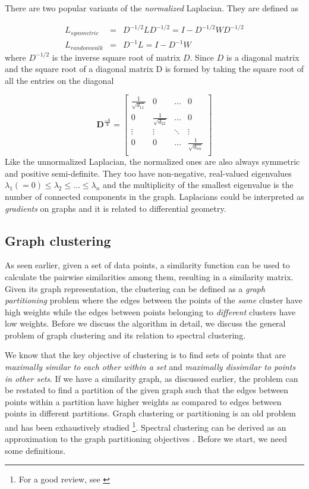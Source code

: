 There are two popular variants of the \textit{normalized} Laplacian. They are defined as

\begin{eqnarray}
	L_{symmetric} &=& D^{-1/2} L D^{-1/2} = I - D^{-1/2} W D^{-1/2} \label{eqn-lap_sym}\\
	L_{random walk} &=& D^{-1}L = I - D^{-1}W 
\end{eqnarray}
where $D^{-1/2}$ is the inverse square root of matrix $D$. Since $D$ is a diagonal matrix and the square root of a diagonal matrix D is formed by taking the square root of all the entries on the diagonal

\begin{displaymath}
    \mathbf{D^{\frac{-1}{2}}} = \begin{bmatrix} \frac{1}{\sqrt{d_{11}}} & 0 & \dots & 0\\
				 0 & \frac{1}{\sqrt{d_{22}}} & \dots & 0\\
                                 \vdots & \vdots & \ddots & \vdots\\
				 0 & 0 & \dots & \frac{1}{\sqrt{d_{nn}}}\\
                 \end{bmatrix}
\end{displaymath}
Like the unnormalized Laplacian, the normalized ones are also always symmetric and positive semi-definite. They too have non-negative, real-valued 
eigenvalues $\lambda_{1}(=0) \leq \lambda_{2}\leq \dots \leq \lambda_{n}$ and the multiplicity of the smallest eigenvalue is the number of 
connected components in the graph. Laplacians could be interpreted as \textit{gradients} on graphs and it is related to differential geometry. 
\subsection{Graph clustering}
As seen earlier, given a set of data points, a similarity function can be used to calculate the pairwise similarities among them, resulting in a similarity matrix. Given its graph representation, the clustering can be defined as a \textit{graph partitioning} problem where the edges between the points of the \textit{same} cluster have high weights while the edges between points belonging to \textit{different} clusters have low weights. Before we discuss the algorithm in detail, we discuss the general problem of graph clustering and its relation to spectral clustering. 

We know that the key objective of clustering is to find sets of points that are \textit{maximally similar to each other within a set} 
and \textit{maximally dissimilar to points in other sets}. If we have a similarity graph, as discussed earlier, the problem can be restated to 
find a partition of the given graph such that the edges between points within a partition have higher weights as compared to edges 
between points in different partitions. Graph clustering or partitioning is an old problem 
and has been exhaustively studied \footnote{For a good review, see \cite{schaeffer1997graphclustering}}. Spectral clustering can be derived as an approximation to the graph partitioning objectives \citep{luxberg2006tutorial_spectral}. Before we start, we need some definitions.

